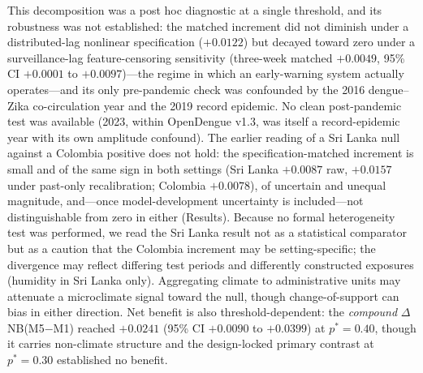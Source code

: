\documentclass[11pt,a4paper]{article}
\begin{document}
This decomposition was a post hoc diagnostic at a single threshold, and its robustness was not established: the matched increment did not diminish under a distributed-lag nonlinear specification ($+0.0122$) but decayed toward zero under a surveillance-lag feature-censoring sensitivity (three-week matched $+0.0049$, 95\% CI $+0.0001$ to $+0.0097$)---the regime in which an early-warning system actually operates---and its only pre-pandemic check was confounded by the 2016 dengue--Zika co-circulation year and the 2019 record epidemic. No clean post-pandemic test was available (2023, within OpenDengue v1.3, was itself a record-epidemic year with its own amplitude confound). The earlier reading of a Sri Lanka null against a Colombia positive does not hold: the specification-matched increment is small and of the same sign in both settings (Sri Lanka $+0.0087$ raw, $+0.0157$ under past-only recalibration; Colombia $+0.0078$), of uncertain and unequal magnitude, and---once model-development uncertainty is included---not distinguishable from zero in either (Results). Because no formal heterogeneity test was performed, we read the Sri Lanka result not as a statistical comparator but as a caution that the Colombia increment may be setting-specific; the divergence may reflect differing test periods and differently constructed exposures (humidity in Sri Lanka only). Aggregating climate to administrative units may attenuate a microclimate signal toward the null, though change-of-support can bias in either direction. Net benefit is also threshold-dependent: the \emph{compound} $\Delta$NB(M5$-$M1) reached $+0.0241$ (95\% CI $+0.0090$ to $+0.0399$) at $p^*=0.40$, though it carries non-climate structure and the design-locked primary contrast at $p^*=0.30$ established no benefit.
\end{document}
